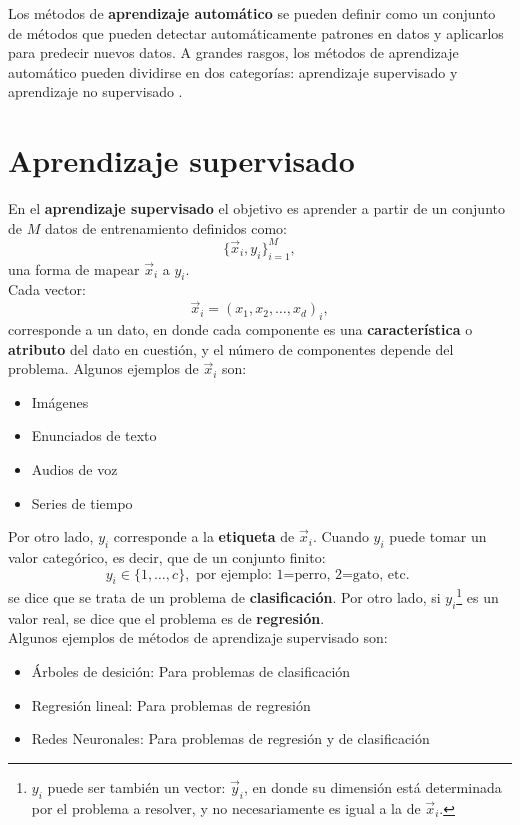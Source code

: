 Los métodos de \textbf{aprendizaje automático} se pueden definir como un conjunto de métodos que pueden detectar automáticamente patrones en datos y aplicarlos para predecir nuevos datos. A grandes rasgos, los métodos de aprendizaje automático pueden dividirse en dos categorías: aprendizaje supervisado y aprendizaje no supervisado \cite{murphy:2013}.

\section{Aprendizaje supervisado}
En el \textbf{aprendizaje supervisado} el objetivo es aprender a partir de un conjunto de $M$ datos de entrenamiento definidos como:
\begin{equation}
\{\vec{x}_i, y_i\}_{i=1}^{M},
\end{equation}
una forma de mapear $\vec{x}_i$ a $y_i$.
\\
Cada vector:
\begin{equation}
  \label{eq:trainset}
\vec{x}_i = (x_1,x_2, \dots , x_d)_i,
\end{equation}
corresponde a un dato, en donde cada componente es una \textbf{característica} o \textbf{atributo} del dato en cuestión, y el número de componentes depende del problema. Algunos ejemplos de $\vec{x}_i$ son:
\begin{itemize}[label=\textcolor{CTtitle}{\textbullet}]
\item Imágenes
\item Enunciados de texto
\item Audios de voz
\item Series de tiempo
\end{itemize}

Por otro lado, $y_i$ corresponde a la \textbf{etiqueta} de $\vec{x}_i$. Cuando $y_i$ puede tomar un valor categórico, es decir, que de un conjunto finito:
$$y_i \in \{1,\dots,c\}, \text{  por ejemplo: 1=perro, 2=gato, etc. }$$ 
se dice que se trata de un problema de \textbf{clasificación}. Por otro lado, si $y_i$\footnote{$y_i$ puede ser también un vector: $\vec{y}_i$, en donde su dimensión está determinada por el problema a resolver, y no necesariamente es igual a la de $\vec{x}_i$.} es un valor real, se dice que el problema es de \textbf{regresión}.
\\

Algunos ejemplos de métodos de aprendizaje supervisado son:
\begin{itemize}[label=\textcolor{CTtitle}{\textbullet}]
\item Árboles de desición: Para problemas de clasificación
\item Regresión lineal: Para problemas de regresión
\item Redes Neuronales: Para problemas de regresión y de clasificación
\end{itemize}

